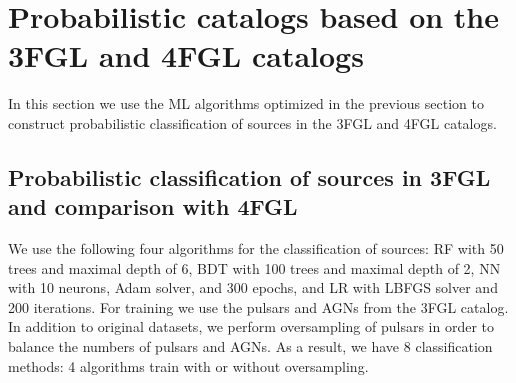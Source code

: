 \section{Probabilistic catalogs based on the 3FGL and 4FGL catalogs}

In this section we use the ML algorithms optimized in the previous section to construct probabilistic
classification of sources in the 3FGL and 4FGL catalogs.


\subsection{Probabilistic classification of sources in 3FGL and comparison with 4FGL}


We use the following four algorithms for the classification of sources: RF with 50 trees and maximal depth of 6, BDT with 100 trees and maximal depth of 2, NN with 10 neurons, Adam solver, and 300 epochs, and LR with LBFGS solver and 200 iterations. 
For training we use the pulsars and AGNs from the 3FGL catalog. In addition to original datasets, we perform oversampling of pulsars in order to balance the numbers of pulsars and AGNs.
As a result, we have 8 classification methods: 4 algorithms train with or without oversampling.

